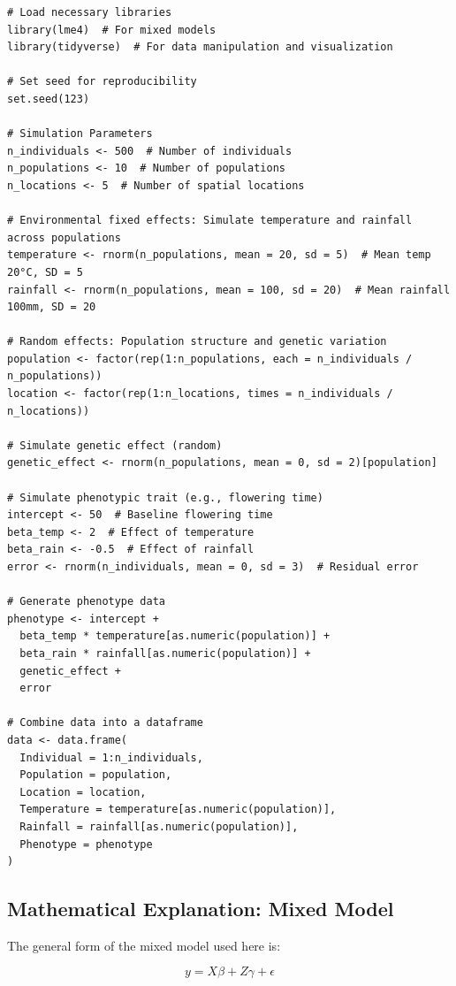 \documentclass[12pt,a4paper]{article}
\begin{document}
\begin{verbatim}
# Load necessary libraries
library(lme4)  # For mixed models
library(tidyverse)  # For data manipulation and visualization

# Set seed for reproducibility
set.seed(123)

# Simulation Parameters
n_individuals <- 500  # Number of individuals
n_populations <- 10  # Number of populations
n_locations <- 5  # Number of spatial locations

# Environmental fixed effects: Simulate temperature and rainfall across populations
temperature <- rnorm(n_populations, mean = 20, sd = 5)  # Mean temp 20°C, SD = 5
rainfall <- rnorm(n_populations, mean = 100, sd = 20)  # Mean rainfall 100mm, SD = 20

# Random effects: Population structure and genetic variation
population <- factor(rep(1:n_populations, each = n_individuals / n_populations))
location <- factor(rep(1:n_locations, times = n_individuals / n_locations))

# Simulate genetic effect (random)
genetic_effect <- rnorm(n_populations, mean = 0, sd = 2)[population]

# Simulate phenotypic trait (e.g., flowering time)
intercept <- 50  # Baseline flowering time
beta_temp <- 2  # Effect of temperature
beta_rain <- -0.5  # Effect of rainfall
error <- rnorm(n_individuals, mean = 0, sd = 3)  # Residual error

# Generate phenotype data
phenotype <- intercept + 
  beta_temp * temperature[as.numeric(population)] + 
  beta_rain * rainfall[as.numeric(population)] + 
  genetic_effect + 
  error

# Combine data into a dataframe
data <- data.frame(
  Individual = 1:n_individuals,
  Population = population,
  Location = location,
  Temperature = temperature[as.numeric(population)],
  Rainfall = rainfall[as.numeric(population)],
  Phenotype = phenotype
)

\end{verbatim}

\subsection{Mathematical Explanation: Mixed Model}

The general form of the mixed model used here is:

\[
y = X\beta + Z\gamma + \epsilon
\]
\end{document}
